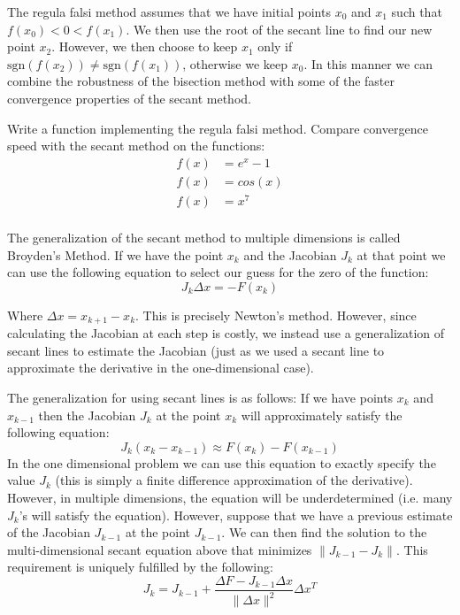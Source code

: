 The regula falsi method assumes that we have initial points $x_0$ and $x_1$ such that $f(x_0) < 0 < f(x_1)$. We then use the root of the secant line to find our new point $x_2$. However, we then choose to keep $x_1$ only if $\mbox{sgn}(f(x_2)) \neq \mbox{sgn}(f(x_1))$, otherwise we keep $x_0$. In this manner we can combine the robustness of the bisection method with some of the faster convergence properties of the secant method.

\begin{problem}
Write a function implementing the regula falsi method. Compare convergence speed with the secant method on the functions:
\begin{align*}
f(x) &= e^x-1\\
f(x) &= cos(x)\\
f(x) &= x^7\\
\end{align*}
\end{problem}

The generalization of the secant method to multiple dimensions is called Broyden's Method.  If we have the point $x_k$ and the Jacobian $J_k$ at that point we can use the following equation to select our guess for the zero of the function:
\begin{equation} \label{Eq:BroydenSolve}
J_k \Delta x = -F(x_k)
\end{equation}

Where $\Delta x = x_{k+1}-x_k$. This is precisely Newton's method. However, since calculating the Jacobian at each step is costly, we instead use a generalization of secant lines to estimate the Jacobian (just as we used a secant line to approximate the derivative in the one-dimensional case).

The generalization for using secant lines is as follows: If we have points $x_k$ and $x_{k-1}$ then the Jacobian $J_k$ at the point $x_k$ will approximately satisfy the following equation:
\begin{equation}
J_k (x_k-x_{k-1}) \approx F(x_k) - F(x_{k-1})
\end{equation}
In the one dimensional problem we can use this equation to exactly specify the value $J_k$ (this is simply a finite difference approximation of the derivative). However, in multiple dimensions, the equation will be underdetermined (i.e. many $J_k$'s will satisfy the equation). However, suppose that we have a previous estimate of the Jacobian $J_{k-1}$ at the point $J_{k-1}$. We can then find the solution to the multi-dimensional secant equation above that minimizes $\|J_{k-1}-J_k\|$. This requirement is uniquely fulfilled by the following:
\begin{equation} \label{Eq:BroydenJacobian}
J_k = J_{k-1} + \frac{\Delta F-J_{k-1} \Delta x}{\|\Delta x\|^2}\Delta x^T
\end{equation}

